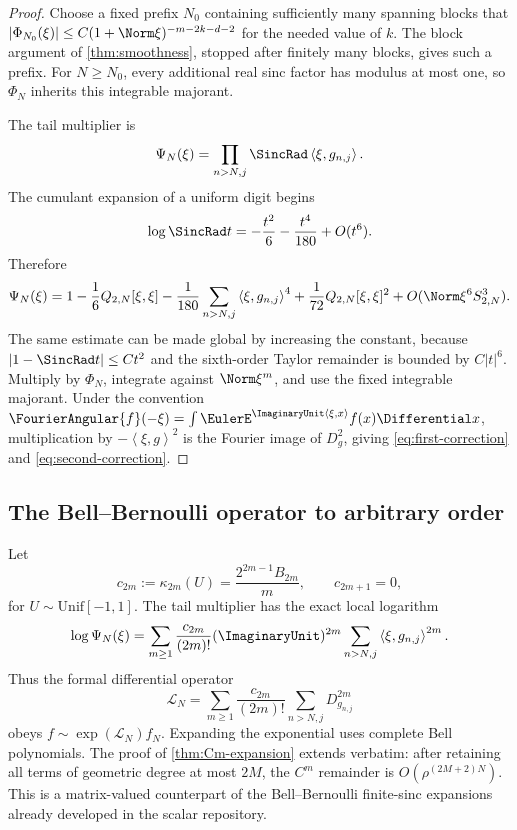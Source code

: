 \documentclass[11pt,oneside]{article}
\theoremstyle{definition}
\theoremstyle{remark}
\newcommand{\ip}[2]{\left\langle #1,#2\right\rangle}
\begin{document}
\begin{proof}
Choose a fixed prefix $N_0$ containing sufficiently many spanning blocks that
$|\Phi_{N_0}(\xi)|\le C(1+\Norm\xi)^{-m-2k-d-2}$ for the needed value of $k$.
The block argument of \cref{thm:smoothness}, stopped after finitely many blocks,
gives such a prefix.  For $N\ge N_0$, every additional real sinc factor has
modulus at most one, so $\Phi_N$ inherits this integrable majorant.

The tail multiplier is
\[
 \Psi_N(\xi)=\prod_{n>N,j}\SincRad\ip{\xi}{g_{n,j}}.
\]
The cumulant expansion of a uniform digit begins
\[
 \log\SincRad t=-\frac{t^2}{6}-\frac{t^4}{180}+O(t^6).
\]
Therefore
\[
 \Psi_N(\xi)=1-\frac16Q_{2,N}[\xi,\xi]
 -\frac1{180}\sum_{n>N,j}\ip{\xi}{g_{n,j}}^4
 +\frac1{72}Q_{2,N}[\xi,\xi]^2
 +O(\Norm\xi^6S_{2,N}^3).
\]
The same estimate can be made global by increasing the constant, because
$|1-\SincRad t|\le Ct^2$ and the sixth-order Taylor remainder is bounded by
$C|t|^6$.  Multiply by $\Phi_N$, integrate against $\Norm\xi^m$, and use the
fixed integrable majorant.  Under the convention
$\FourierAngular{f}(-\xi)=\int\EulerE^{\ImaginaryUnit\ip{\xi}{x}}f(x)\Differential x$, multiplication by
$-\ip{\xi}{g}^2$ is the Fourier image of $D_g^2$, giving
\eqref{eq:first-correction} and \eqref{eq:second-correction}.
\end{proof}

\subsection{The Bell--Bernoulli operator to arbitrary order}

Let
\begin{equation}
 c_{2m}:=\kappa_{2m}(U)
 =\frac{2^{2m-1}B_{2m}}{m},
 \qquad c_{2m+1}=0,
 \label{eq:uniform-cumulants}
\end{equation}
for $U\sim\mathrm{Unif}[-1,1]$.  The tail multiplier has the exact local
logarithm
\begin{equation}
 \log\Psi_N(\xi)
 =\sum_{m\ge1}\frac{c_{2m}}{(2m)!}
   (\ImaginaryUnit)^{2m}\sum_{n>N,j}\ip{\xi}{g_{n,j}}^{2m}.
 \label{eq:tail-log}
\end{equation}
Thus the formal differential operator
\begin{equation}
 \mathcal L_N
 =\sum_{m\ge1}\frac{c_{2m}}{(2m)!}
  \sum_{n>N,j}D_{g_{n,j}}^{2m}
 \label{eq:tail-operator}
\end{equation}
obeys $f\sim\exp(\mathcal L_N)f_N$.  Expanding the exponential uses complete
Bell polynomials.  The proof of \cref{thm:Cm-expansion} extends verbatim: after
retaining all terms of geometric degree at most $2M$, the $C^m$ remainder is
$O(\rho^{(2M+2)N})$.  This is a matrix-valued counterpart of the Bell--Bernoulli
finite-sinc expansions already developed in the scalar repository.
\end{document}
